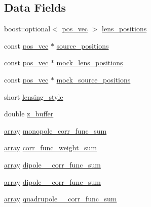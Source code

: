 \subsection*{Data Fields}
\begin{DoxyCompactItemize}
\item 
boost\-::optional$<$ \hyperlink{structcorr__func__bin_a683c7075740b3dcae9ebb1ac758c0bfa}{pos\-\_\-vec} $>$ \hyperlink{structcorr__func__bin_a601e7197de34d3834da398e25d022d3f}{lens\-\_\-positions}
\item 
const \hyperlink{structcorr__func__bin_a683c7075740b3dcae9ebb1ac758c0bfa}{pos\-\_\-vec} $\ast$ \hyperlink{structcorr__func__bin_aca9a4da34951ee169664eb0be68d0d61}{source\-\_\-positions}
\item 
const \hyperlink{structcorr__func__bin_a683c7075740b3dcae9ebb1ac758c0bfa}{pos\-\_\-vec} $\ast$ \hyperlink{structcorr__func__bin_aaac462575c7b070e0de95a91efd7e442}{mock\-\_\-lens\-\_\-positions}
\item 
const \hyperlink{structcorr__func__bin_a683c7075740b3dcae9ebb1ac758c0bfa}{pos\-\_\-vec} $\ast$ \hyperlink{structcorr__func__bin_ab19a27c7247dbf76311cc7fc4b34c080}{mock\-\_\-source\-\_\-positions}
\item 
short \hyperlink{structcorr__func__bin_a65d8550c1986a01d457c96280f1f0cee}{lensing\-\_\-style}
\item 
double \hyperlink{structcorr__func__bin_a84d10388283c2977e9338534303e355b}{z\-\_\-buffer}
\item 
\hyperlink{structcorr__func__bin_a266e654606807bf423b915c6ef9ff7ab}{array} \hyperlink{structcorr__func__bin_af930e7039de00d0c73dfcb6f6a24c25b}{monopole\-\_\-corr\-\_\-func\-\_\-sum}
\item 
\hyperlink{structcorr__func__bin_a266e654606807bf423b915c6ef9ff7ab}{array} \hyperlink{structcorr__func__bin_aa8da5da871a5bc83c19a11fabf7061f4}{corr\-\_\-func\-\_\-weight\-\_\-sum}
\item 
\hyperlink{structcorr__func__bin_a266e654606807bf423b915c6ef9ff7ab}{array} \hyperlink{structcorr__func__bin_a68c613176dafabef7c1b0b617867d8e7}{dipole\-\_\-\_\-corr\-\_\-func\-\_\-sum}
\item 
\hyperlink{structcorr__func__bin_a266e654606807bf423b915c6ef9ff7ab}{array} \hyperlink{structcorr__func__bin_accf926a9793c65672206befc997e55f7}{dipole\-\_\-\_\-corr\-\_\-func\-\_\-sum}
\item 
\hyperlink{structcorr__func__bin_a266e654606807bf423b915c6ef9ff7ab}{array} \hyperlink{structcorr__func__bin_ac0e011470789b147de20bbe457a65716}{quadrupole\-\_\-\_\-corr\-\_\-func\-\_\-sum}

\end{DoxyCompactItemize}
